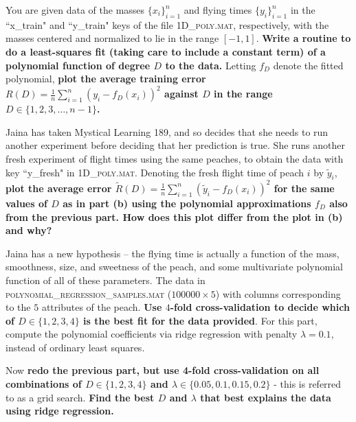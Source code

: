 \begin{Parts}


\Part You are given data of the masses $\{x_i\}_{i=1}^n$ and flying times $\{y_i\}_{i=1}^n$ in the ``x\_train" and ``y\_train" keys of the file \textsc{1D\_poly.mat}, respectively, with the masses centered and normalized to lie in the range $[-1, 1]$. {\bf Write a routine to do a least-squares fit (taking care to include a constant term) of a polynomial function of degree $D$ to the data.} Letting $f_D$ denote the fitted polynomial, {\bf plot the average training error $R(D) = \frac{1}{n} \sum_{i=1}^n (y_i - f_D(x_i))^2$ against $D$ in the range $D \in \{1, 2, 3, \ldots, n-1\}$.}


\Part Jaina has taken Mystical Learning 189, and so decides that she needs to run another experiment before deciding that her prediction is true. She runs another fresh experiment of flight times using the same peaches, to obtain the data with key ``y\_fresh" in \textsc{1D\_poly.mat}. Denoting the fresh flight time of peach $i$ by $\tilde{y}_i$, {\bf plot the average error $\tilde{R}(D) = \frac{1}{n} \sum_{i=1}^n (\tilde{y}_i - f_D(x_i))^2$ for the same values of $D$ as in part (b) using the polynomial approximations $f_D$ also from the previous part. How does this plot differ from the plot in (b) and why?}


\Part Jaina has a new hypothesis -- the flying time is actually a function of the mass, smoothness, size, and sweetness of the peach, and some multivariate polynomial function of all of these parameters. The data in \textsc{polynomial\_regression\_samples.mat} ($100000 \times 5$) with columns corresponding to the $5$ attributes of the peach. {\bf Use $4$-fold cross-validation to decide which of $D \in \{1, 2, 3, 4\}$ is the best fit for the data provided}. For this part, compute the polynomial coefficients via ridge regression with penalty $\lambda = 0.1$, instead of ordinary least squares.


\Part Now {\bf redo the previous part, but use 4-fold cross-validation on all combinations of $D \in \{1, 2,3,4\} $ and $\lambda \in \{0.05, 0.1, 0.15, 0.2\}$} - this is referred to as a grid search. {\bf Find the best $D$ and $\lambda$ that best explains the data using ridge regression.}

\end{Parts}

